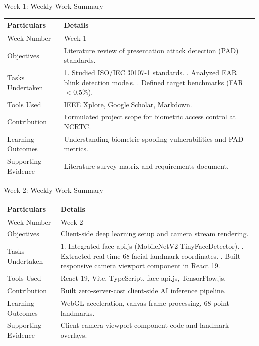 \documentclass[aspectratio=169, 11pt]{beamer}
\begin{document}
\begin{frame}{Week 1: Weekly Work Summary}
\small
\renewcommand{\arraystretch}{1.2}
\begin{tabular}{|p{3.2cm}|p{8.0cm}|}
\hline
\rowcolor{gray!15} \textbf{Particulars} & \textbf{Details} \\ \hline
Week Number & Week 1 \\ \hline
Objectives & Literature review of presentation attack detection (PAD) standards. \\ \hline
Tasks Undertaken & 1. Studied ISO/IEC 30107-1 standards. \newline 2. Analyzed EAR blink detection models. \newline 3. Defined target benchmarks (FAR $<0.5\%$). \\ \hline
Tools Used & IEEE Xplore, Google Scholar, Markdown. \\ \hline
Contribution & Formulated project scope for biometric access control at NCRTC. \\ \hline
Learning Outcomes & Understanding biometric spoofing vulnerabilities and PAD metrics. \\ \hline
Supporting Evidence & Literature survey matrix and requirements document. \\ \hline
\end{tabular}
\end{frame}

\begin{frame}{Week 2: Weekly Work Summary}
\small
\renewcommand{\arraystretch}{1.2}
\begin{tabular}{|p{3.2cm}|p{8.0cm}|}
\hline
\rowcolor{gray!15} \textbf{Particulars} & \textbf{Details} \\ \hline
Week Number & Week 2 \\ \hline
Objectives & Client-side deep learning setup and camera stream rendering. \\ \hline
Tasks Undertaken & 1. Integrated face-api.js (MobileNetV2 TinyFaceDetector). \newline 2. Extracted real-time 68 facial landmark coordinates. \newline 3. Built responsive camera viewport component in React 19. \\ \hline
Tools Used & React 19, Vite, TypeScript, face-api.js, TensorFlow.js. \\ \hline
Contribution & Built zero-server-cost client-side AI inference pipeline. \\ \hline
Learning Outcomes & WebGL acceleration, canvas frame processing, 68-point landmarks. \\ \hline
Supporting Evidence & Client camera viewport component code and landmark overlays. \\ \hline
\end{tabular}
\end{frame}
\end{document}
